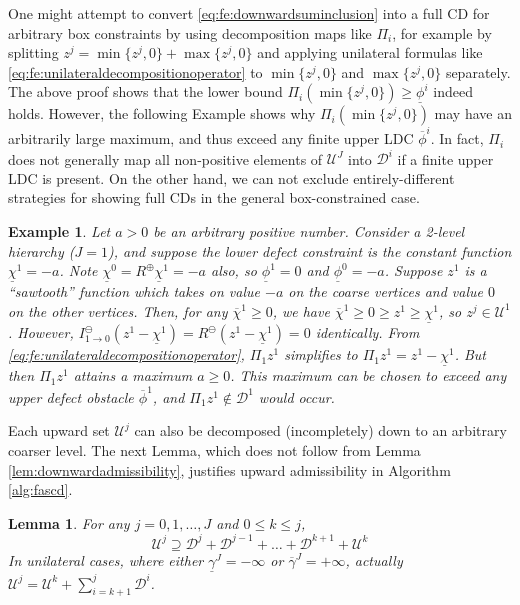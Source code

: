 \documentclass[letterpaper,final,12pt,reqno]{amsart}
\theoremstyle{cstyle}
\newtheorem{lemma}[theorem]{Lemma}
\theoremstyle{cstyle*}
\theoremstyle{dstyle}
\newtheorem{example}[theorem]{Example}
\numberwithin{equation}{section}
\numberwithin{figure}{section}
\numberwithin{table}{section}
\numberwithin{theorem}{section}
\newcommand{\maxR}{R^{\bm{\oplus}}}
\newcommand{\minR}{R^{\bm{\ominus}}}
\begin{document}
One might attempt to convert \eqref{eq:fe:downwardsuminclusion} into a full CD for arbitrary box constraints by using decomposition maps like $\Pi_i$, for example by splitting $z^j = \min\{z^j,0\} + \max\{z^j,0\}$ and applying unilateral formulas like \eqref{eq:fe:unilateraldecompositionoperator} to $\min\{z^j,0\}$ and $\max\{z^j,0\}$ separately.  The above proof shows that the lower bound $\Pi_i (\min\{z^j,0\}) \ge \underline{\phi}^i$ indeed holds.  However, the following Example shows why $\Pi_i(\min\{z^j,0\})$ may have an arbitrarily large maximum, and thus exceed any finite upper LDC $\overline{\phi}^i$.  In fact, $\Pi_i$ does not generally map all non-positive elements of $\mathcal{U}^J$ into $\mathcal{D}^i$ if a finite upper LDC is present.  On the other hand, we can not exclude entirely-different strategies for showing full CDs in the general box-constrained case.

\begin{example}  \label{ex:notfullcd}
Let $a > 0$ be an arbitrary positive number.  Consider a 2-level hierarchy ($J=1$), and suppose the lower defect constraint is the constant function $\underline{\chi}^1=-a$.  Note $\underline{\chi}^0=\maxR \underline{\chi}^1=-a$ also, so $\underline{\phi}^1=0$ and $\underline{\phi}^0=-a$.  Suppose $z^1$ is a ``sawtooth'' function which takes on value $-a$ on the coarse vertices and value $0$ on the other vertices.  Then, for any $\overline{\chi}^1\ge 0$, we have $\overline{\chi}^1 \ge 0 \ge z^1\ge \underline{\chi}^1$, so $z^j \in \mathcal{U}^1$.  However, $I_{1\to 0}^\ominus(z^1 - \underline{\chi}^1) = \minR(z^1 - \underline{\chi}^1) = 0$ identically.  From \eqref{eq:fe:unilateraldecompositionoperator}, $\Pi_1 z^1$ simplifies to $\Pi_1 z^1 = z^1 - \underline{\chi}^1$.  But then $\Pi_1 z^1$ attains a maximum $a\ge 0$.  This maximum can be chosen to exceed any upper defect obstacle $\overline{\phi}^1$, and $\Pi_1 z^1 \notin \mathcal{D}^1$ would occur.
\end{example}

Each upward set $\mathcal{U}^j$ can also be decomposed (incompletely) down to an arbitrary coarser level.  The next Lemma, which does not follow from Lemma \ref{lem:downwardadmissibility}, justifies upward admissibility in Algorithm \ref{alg:fascd}.

\begin{lemma}  \label{lem:upwardadmissibility}  For any $j=0,1,\dots,J$ and $0\le k\le j$,
\begin{equation}
\mathcal{U}^j \supseteq \mathcal{D}^j + \mathcal{D}^{j-1} + \dots + \mathcal{D}^{k+1} + \mathcal{U}^k \label{eq:fe:upwardsuminclusion}
\end{equation}
In unilateral cases, where either $\underline{\gamma}^J=-\infty$ or $\overline{\gamma}^J=+\infty$, actually $\mathcal{U}^j = \mathcal{U}^k + \sum_{i=k+1}^j \mathcal{D}^i$. \end{lemma}
\end{document}

